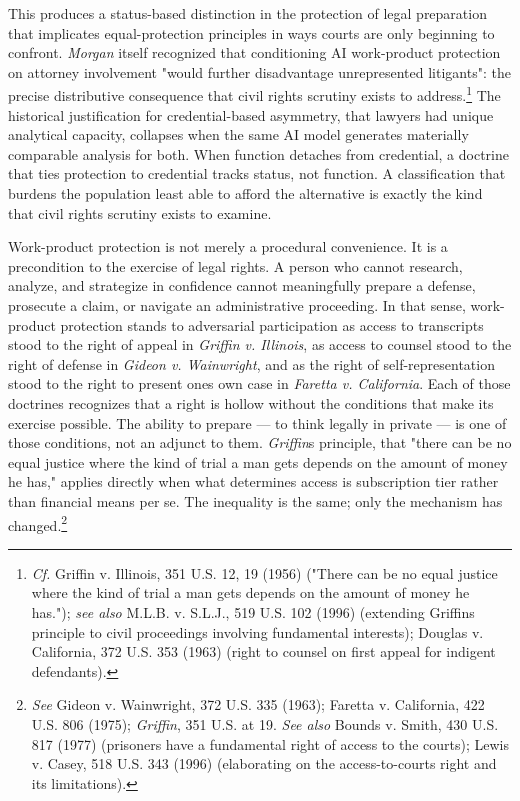 \documentclass[
  12pt,
]{article}
\begin{document}
This produces a status-based distinction in the protection of legal
preparation that implicates equal-protection principles in ways courts
are only beginning to confront. \emph{Morgan} itself recognized that
conditioning AI work-product protection on attorney involvement "would
further disadvantage unrepresented litigants": the precise distributive
consequence that civil rights scrutiny exists to address.\footnote{\emph{Cf.}
  Griffin v. Illinois, 351 U.S. 12, 19 (1956) ("There can be no equal
  justice where the kind of trial a man gets depends on the amount of
  money he has."); \emph{see also} M.L.B. v. S.L.J., 519 U.S. 102 (1996)
  (extending Griffin\textquotesingle s principle to civil proceedings
  involving fundamental interests); Douglas v. California, 372 U.S. 353
  (1963) (right to counsel on first appeal for indigent defendants).}
The historical justification for credential-based asymmetry, that
lawyers had unique analytical capacity, collapses when the same AI model
generates materially comparable analysis for both. When function
detaches from credential, a doctrine that ties protection to credential
tracks status, not function. A classification that burdens the
population least able to afford the alternative is exactly the kind that
civil rights scrutiny exists to examine.

Work-product protection is not merely a procedural convenience. It is a
precondition to the exercise of legal rights. A person who cannot
research, analyze, and strategize in confidence cannot meaningfully
prepare a defense, prosecute a claim, or navigate an administrative
proceeding. In that sense, work-product protection stands to adversarial
participation as access to transcripts stood to the right of appeal in
\emph{Griffin v. Illinois}, as access to counsel stood to the right of
defense in \emph{Gideon v. Wainwright}, and as the right of
self-representation stood to the right to present one\textquotesingle s
own case in \emph{Faretta v. California}. Each of those doctrines
recognizes that a right is hollow without the conditions that make its
exercise possible. The ability to prepare --- to think legally in
private --- is one of those conditions, not an adjunct to them.
\emph{Griffin}\textquotesingle s principle, that "there can be no equal
justice where the kind of trial a man gets depends on the amount of
money he has," applies directly when what determines access is
subscription tier rather than financial means per se. The inequality is
the same; only the mechanism has changed.\footnote{\emph{See} Gideon v.
  Wainwright, 372 U.S. 335 (1963); Faretta v. California, 422 U.S. 806
  (1975); \emph{Griffin}, 351 U.S. at 19. \emph{See also} Bounds v.
  Smith, 430 U.S. 817 (1977) (prisoners have a fundamental right of
  access to the courts); Lewis v. Casey, 518 U.S. 343 (1996)
  (elaborating on the access-to-courts right and its limitations).}
\end{document}

